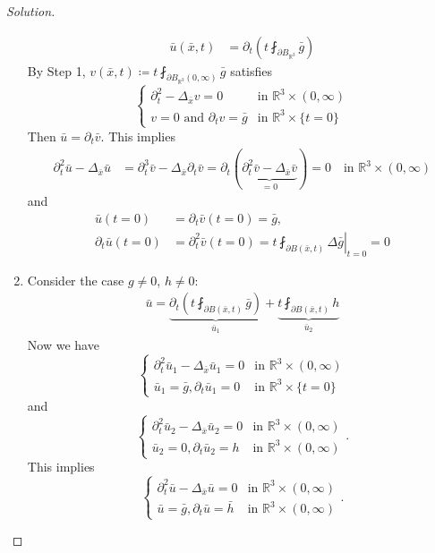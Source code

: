 \documentclass{report}
\theoremstyle{tommy}
\begin{document}
\begin{proof}[Solution]
\begin{enumerate}[label=Step \arabic*:]
\begin{align*}
          \bar u(\bar x, t) &= \partial_t \left(t \fint_{\partial B_{\mathbb{R}^3}} \bar g\right)
        \end{align*}
        By Step 1, \(v(\bar x, t) \coloneqq t \fint_{\partial B_{\mathbb{R}^3}(0,\infty)} \bar g\) satisfies 
        \[\begin{cases}
          \partial_t^2 - \Delta_{\bar x} v = 0 &\text{in } \mathbb{R}^3 \times (0,\infty) \\
          v = 0 \text{ and } \partial_t v = \bar g &\text{in } \mathbb{R}^3 \times \{t = 0\}
        \end{cases}\]
        Then \(\bar u = \partial_t \bar v\). This implies 
        \begin{align*}
          \partial_t^2 \bar u - \Delta_{\bar x} \bar u &= \partial_t^3 \bar v - \Delta_{\bar x} \partial_t \bar v = \partial_t (\underbrace{\partial_t^2 \bar v - \Delta_{\bar x} \bar v}_{= 0}) = 0 \quad \text{in } \mathbb{R}^3 \times (0,\infty)
        \end{align*}
        and 
        \begin{align*}
          \bar u(t=0) &= \partial_t \bar v(t=0) = \bar g, \\\partial_t \bar u(t=0) &= \partial_t^2 \bar v(t=0) = \left. t \fint_{\partial B(\bar x, t)} \Delta \bar g \right|_{t = 0} = 0
        \end{align*}
      \item Consider the case \(g \ne 0\), \(h \ne 0\):
      \begin{align*}
        \bar u = \underbrace{\partial_t \left(t \fint_{\partial B(\bar x, t)} \bar g\right)}_{\bar u_1} + \underbrace{t \fint_{\partial B(\bar x, t)}h}_{\bar u_2}
      \end{align*}
      Now we have 
      \[
      \begin{cases}
        \partial_t^2 \bar u_1 - \Delta_{\bar x} \bar u_1 = 0 &\text{in } \mathbb{R}^3 \times (0,\infty) \\ 
        \bar u_1 = \bar g, \partial_t \bar u_1 = 0 &\text{in } \mathbb{R}^3 \times \{t=0\}
      \end{cases}\]
      and 
      \[\begin{cases}
        \partial_t^2 \bar u_2 - \Delta_{\bar x} \bar u_2 = 0 &\text{in } \mathbb{R}^3 \times (0,\infty) \\ 
        \bar u_2 = 0, \partial_t \bar u_2 = h &\text{in }\mathbb{R}^3 \times (0,\infty)
      \end{cases}.\]
      This implies 
      \[\begin{cases}
        \partial_t^2 \bar u - \Delta_{\bar x} \bar u = 0 &\text{in } \mathbb{R}^3 \times (0,\infty) \\ 
        \bar u = \bar g, \partial_t \bar u = \bar h &\text{in }\mathbb{R}^3 \times (0,\infty)
      \end{cases}.\]
    \end{enumerate}
  \end{proof}
\end{document}

